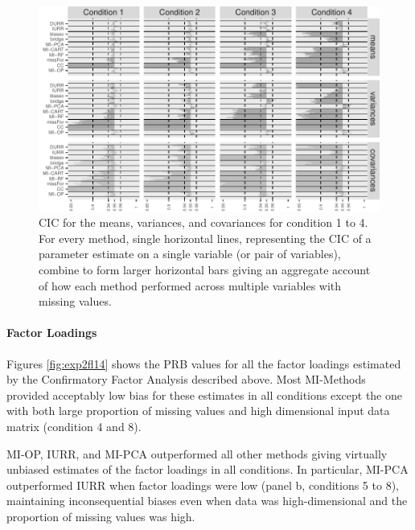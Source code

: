 \begin{figure}
	\includegraphics{../../output/graphs/exp2_semR_ci_14.pdf}
\caption{CIC for the means, variances, and covariances for condition 1 to 4.
	For every method, single horizontal lines, representing the CIC of a parameter estimate on 
	a single variable (or pair of variables), combine to form larger horizontal bars giving an 
	aggregate account of how each method performed across multiple variables with missing values.
}
\label{fig:exp2cir}
\end{figure}

\FloatBarrier %

	\paragraph{Factor Loadings}
	Figures \ref{fig:exp2fl14} shows the PRB values for all the factor loadings estimated by
	the Confirmatory Factor Analysis described above. 
	Most MI-Methods provided acceptably low bias for these estimates in all conditions except the one with 
	both large proportion of missing values and high dimensional input data matrix (condition 4 and 8).

	MI-OP, IURR, and MI-PCA outperformed all other methods giving virtually unbiased estimates
	of the factor loadings in all conditions.
	In particular, MI-PCA outperformed IURR when factor loadings were low (panel b, conditions 5 to 8), 
	maintaining inconsequential biases even when data was high-dimensional and the proportion of missing 
	values was high.

